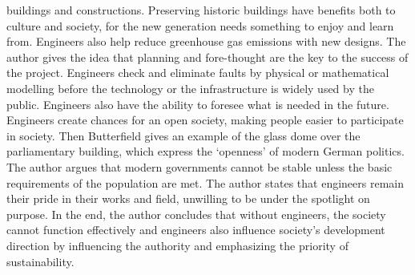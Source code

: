 \documentclass[12pt,a4]{article}
\begin{document}
buildings and constructions.
Preserving historic buildings have benefits both to culture and society, for the
new generation needs something to enjoy and learn from.
Engineers also help reduce greenhouse gas emissions with new designs.
%
%
The author gives the idea that planning and fore-thought are the key to the
success of the project.
Engineers check and eliminate faults by physical or mathematical modelling
before the technology or the infrastructure is widely used by the public.
Engineers also have the ability to foresee what is needed in the future.
%
%
Engineers create chances for an open society, making people easier to
participate in society.
Then Butterfield gives an example of the glass dome over the parliamentary
building, which express the `openness' of modern German politics.
The author argues that modern governments cannot be stable unless the basic
requirements of the population are met.
%
The author states that engineers remain their pride in their works and field,
unwilling to be under the spotlight on purpose.
%
In the end, the author concludes that without engineers, the society cannot
function effectively and engineers also influence society's development
direction by influencing the authority and emphasizing the priority of
sustainability.
%
%

\newpage


\end{document}
